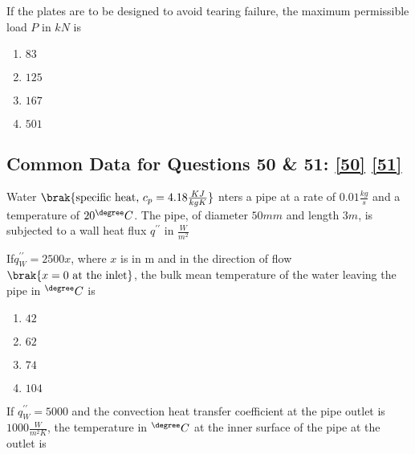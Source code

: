     \item 
    If the plates are to be designed to avoid tearing failure, the maximum permissible load $P$ in $kN$ is \label{49}
    \hfill{}

    \begin{multicols}{4}
        \begin{enumerate}
            \item $83$
            \item $125$
            \item $167$
            \item $501$
        \end{enumerate}
    \end{multicols}

    \subsection{Common Data for Questions 50 \& 51: \ref{50} \ref{51}}

    Water $\brak{\text{specific heat, } c_p = 4.18 \frac{KJ}{kgK}}$ nters a pipe at a rate of $0.01 \frac{kg}{s}$ and a temperature of $20^{\degree} C$. The pipe, of diameter $50 mm$ and length $3 m$, is subjected to a wall heat flux $q^{\prime\prime}$ in $\frac{W}{m^2}$\\
    
    \item 
    If$q_W^{\prime\prime} = 2500x $, where $x$ is in m and in the direction of flow $\brak{x = 0\text{ at the inlet}}$, the bulk mean temperature of the water leaving the pipe in $^{\degree} C$ is \label{50}
    \hfill{}

    \begin{multicols}{4}
        \begin{enumerate}
            \item $42$
            \item $62$
            \item $74$
            \item $104$
        \end{enumerate}
    \end{multicols}

    \item
    If $q_W^{\prime\prime} = 5000$ and the convection heat transfer coefficient at the pipe outlet is $1000\frac{W}{m^2K}$, the temperature in $^{\degree} C$ at the inner surface of the pipe at the outlet is \label{51}
    \hfill{}

